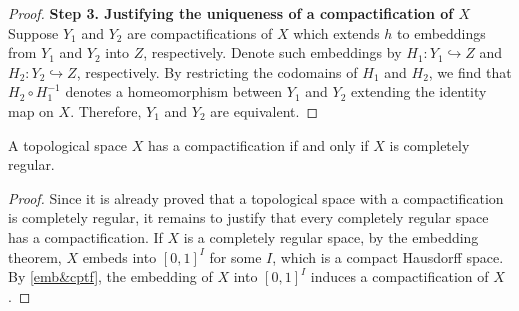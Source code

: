 \begin{proof}
    \indent\textbf{Step 3. Justifying the uniqueness of a compactification of $X$}\newline
    Suppose $Y_1$ and $Y_2$ are compactifications of $X$ which extends $h$ to embeddings from $Y_1$ and $Y_2$ into $Z$, respectively.
    Denote such embeddings by $H_1: Y_1\hookrightarrow Z$ and $H_2: Y_2\hookrightarrow Z$, respectively.
    By restricting the codomains of $H_1$ and $H_2$, we find that $H_2\circ H_1^{-1}$ denotes a homeomorphism between $Y_1$ and $Y_2$ extending the identity map on $X$.
    Therefore, $Y_1$ and $Y_2$ are equivalent.
\end{proof}
\begin{cor}
    A topological space $X$ has a compactification if and only if $X$ is completely regular.
\end{cor}
\begin{proof}
    Since it is already proved that a topological space with a compactification is completely regular, it remains to justify that every completely regular space has a compactification.
    If $X$ is a completely regular space, by the embedding theorem, $X$ embeds into $[0, 1]^I$ for some $I$, which is a compact Hausdorff space.
    By \cref{emb&cptf}, the embedding of $X$ into $[0, 1]^I$ induces a compactification of $X$.
\end{proof}
